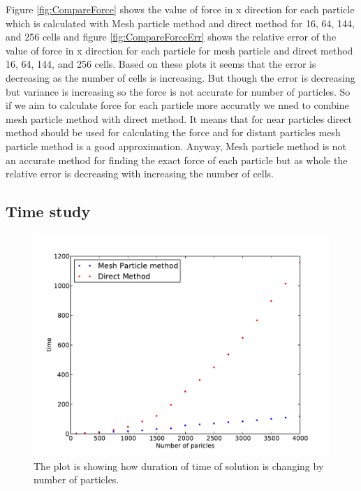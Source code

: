 \documentclass[10pt]{article}
\begin{document}
Figure \ref{fig:CompareForce} shows the value of force in x direction for each particle which is calculated with Mesh particle method and direct method for 16, 64, 144, and 256 cells and figure \ref{fig:CompareForceErr} shows the relative error of the value of force in x direction for each particle for mesh particle and direct method 16, 64, 144, and 256 cells. Based on these plots it seems that the error is decreasing as the number of cells is increasing. But though the error is decreasing but variance is increasing so the force is not accurate for number of particles. So if we aim to calculate force for each particle more accuratly we nned to combine mesh particle method with direct method. It means that for near particles direct method should be used for calculating the force and for distant particles mesh particle method is a good approximation. Anyway, Mesh particle method is not an accurate method for finding the exact force of each particle but as whole the relative error is decreasing with increasing the number of cells. 

\subsection{Time study}

\begin{figure}[hbt]
  \begin{center}
    \includegraphics[scale=0.6]{Plots/time/timeI.pdf}
    \caption{\label{fig:TimeI} The plot is showing how duration of time of solution is changing by number of particles.}
  \end{center}
\end{figure}
\end{document}
